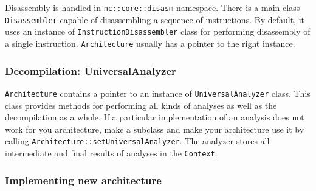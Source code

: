 \documentclass[a4paper,12pt]{article}
\newcommand{\ident}[1]{\texttt{#1}}
\begin{document}
Disassembly is handled in \ident{nc::core::disasm} namespace.
There is a main class \ident{Disassembler} capable of disassembling a sequence of instructions.
By default, it uses an instance of \ident{InstructionDisassembler} class for performing disassembly of a single instruction.
\ident{Architecture} usually has a pointer to the right instance.

\subsubsection{Decompilation: UniversalAnalyzer}

\ident{Architecture} contains a pointer to an instance of \ident{UniversalAnalyzer} class.
This class provides methods for performing all kinds of analyses as well as the decompilation as a whole.
If a particular implementation of an analysis does not work for you architecture, make a subclass and make your architecture use it by calling \ident{Architecture::setUniversalAnalyzer}.
The analyzer stores all intermediate and final results of analyses in the \ident{Context}.

\subsubsection{Implementing new architecture}\label{new_architecture}
\end{document}
